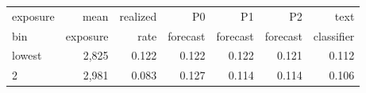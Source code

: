 \begin{tabular}{lrrrrrr}
\toprule
exposure & mean & realized & P0 & P1 & P2 & text \\
bin & exposure & rate & forecast & forecast & forecast & classifier \\
\midrule
lowest & 2,825 & 0.122 & 0.122 & 0.122 & 0.121 & 0.112 \\
2 & 2,981 & 0.083 & 0.127 & 0.114 & 0.114 & 0.106 \\

\end{tabular}
